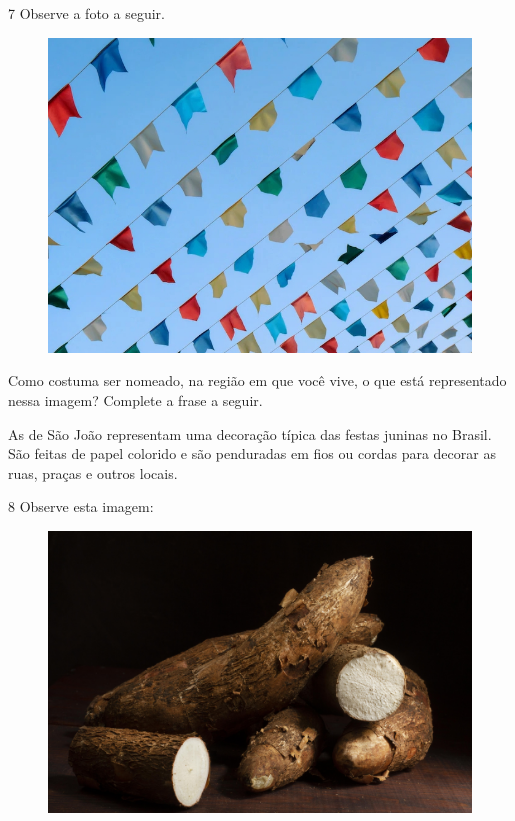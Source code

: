 
\num{7} Observe a foto a seguir.

\begin{figure}[htpb!]
\includegraphics[width=\textwidth]{./imgs/img19.jpg}
\end{figure}


Como costuma ser nomeado, na região em que você vive, o que está representado nessa imagem?
Complete a frase a seguir.\bigskip

As  de São João representam uma decoração típica das
festas juninas no Brasil. São feitas de papel colorido e são penduradas
em fios ou cordas para decorar as ruas, praças e outros locais.

\pagebreak

\num{8} Observe esta imagem:

\begin{figure}[htpb!]
\centering
\includegraphics[width=.5\textwidth]{./imgs/img19b.jpg}
\end{figure}

